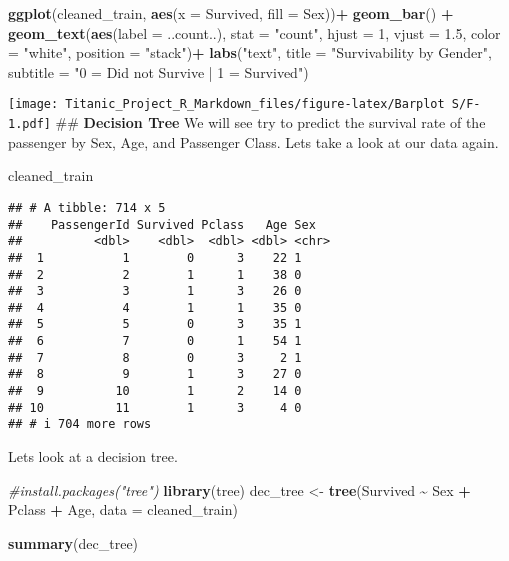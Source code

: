 \documentclass[
]{article}
\newenvironment{Shaded}{\begin{snugshade}}{\end{snugshade}}
\newcommand{\AttributeTok}[1]{\textcolor[rgb]{0.13,0.29,0.53}{#1}}
\newcommand{\CommentTok}[1]{\textcolor[rgb]{0.56,0.35,0.01}{\textit{#1}}}
\newcommand{\DecValTok}[1]{\textcolor[rgb]{0.00,0.00,0.81}{#1}}
\newcommand{\FloatTok}[1]{\textcolor[rgb]{0.00,0.00,0.81}{#1}}
\newcommand{\FunctionTok}[1]{\textcolor[rgb]{0.13,0.29,0.53}{\textbf{#1}}}
\newcommand{\NormalTok}[1]{#1}
\newcommand{\OtherTok}[1]{\textcolor[rgb]{0.56,0.35,0.01}{#1}}
\newcommand{\SpecialCharTok}[1]{\textcolor[rgb]{0.81,0.36,0.00}{\textbf{#1}}}
\newcommand{\StringTok}[1]{\textcolor[rgb]{0.31,0.60,0.02}{#1}}
\begin{document}
\begin{Shaded}
\begin{Highlighting}[]
\FunctionTok{ggplot}\NormalTok{(cleaned\_train, }\FunctionTok{aes}\NormalTok{(}\AttributeTok{x =}\NormalTok{ Survived, }\AttributeTok{fill =}\NormalTok{ Sex))}\SpecialCharTok{+} 
 \FunctionTok{geom\_bar}\NormalTok{() }\SpecialCharTok{+} 
  \FunctionTok{geom\_text}\NormalTok{(}\FunctionTok{aes}\NormalTok{(}\AttributeTok{label =}\NormalTok{ ..count..), }\AttributeTok{stat =} \StringTok{"count"}\NormalTok{, }\AttributeTok{hjust =} \DecValTok{1}\NormalTok{, }\AttributeTok{vjust =} \FloatTok{1.5}\NormalTok{, }\AttributeTok{color =} \StringTok{"white"}\NormalTok{, }\AttributeTok{position =} \StringTok{"stack"}\NormalTok{)}\SpecialCharTok{+}
  \FunctionTok{labs}\NormalTok{(}\StringTok{"text"}\NormalTok{, }\AttributeTok{title =} \StringTok{"Survivability by Gender"}\NormalTok{, }\AttributeTok{subtitle =} \StringTok{"0 = Did not Survive | 1 = Survived"}\NormalTok{)}
\end{Highlighting}
\end{Shaded}

\texttt{[image: Titanic\_Project\_R\_Markdown\_files/figure-latex/Barplot S/F-1.pdf]}
\#\# \textbf{Decision Tree} We will see try to predict the survival rate
of the passenger by Sex, Age, and Passenger Class. Lets take a look at
our data again.

\begin{Shaded}
\begin{Highlighting}[]
\NormalTok{cleaned\_train}
\end{Highlighting}
\end{Shaded}

\begin{verbatim}
## # A tibble: 714 x 5
##    PassengerId Survived Pclass   Age Sex  
##          <dbl>    <dbl>  <dbl> <dbl> <chr>
##  1           1        0      3    22 1    
##  2           2        1      1    38 0    
##  3           3        1      3    26 0    
##  4           4        1      1    35 0    
##  5           5        0      3    35 1    
##  6           7        0      1    54 1    
##  7           8        0      3     2 1    
##  8           9        1      3    27 0    
##  9          10        1      2    14 0    
## 10          11        1      3     4 0    
## # i 704 more rows
\end{verbatim}

Lets look at a decision tree.

\begin{Shaded}
\begin{Highlighting}[]
\CommentTok{\#install.packages("tree")}
\FunctionTok{library}\NormalTok{(tree)}
\NormalTok{dec\_tree }\OtherTok{\textless{}{-}} \FunctionTok{tree}\NormalTok{(Survived }\SpecialCharTok{\textasciitilde{}}\NormalTok{ Sex }\SpecialCharTok{+}\NormalTok{ Pclass }\SpecialCharTok{+}\NormalTok{ Age, }\AttributeTok{data =}\NormalTok{ cleaned\_train)}

\FunctionTok{summary}\NormalTok{(dec\_tree)}
\end{Highlighting}
\end{Shaded}
\end{document}
